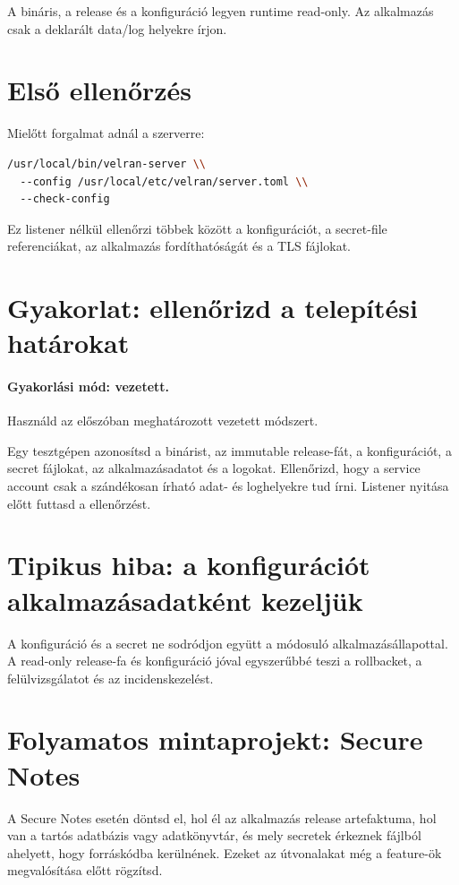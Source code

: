 A bináris, a release és a konfiguráció legyen runtime read-only. Az alkalmazás csak a deklarált data/log helyekre írjon.

\section{Első ellenőrzés}

Mielőtt forgalmat adnál a szerverre:

\begin{lstlisting}[language=bash]
/usr/local/bin/velran-server \\
  --config /usr/local/etc/velran/server.toml \\
  --check-config
\end{lstlisting}

Ez listener nélkül ellenőrzi többek között a konfigurációt, a secret-file referenciákat, az alkalmazás fordíthatóságát és a TLS fájlokat.

\section{Gyakorlat: ellenőrizd a telepítési határokat}
\paragraph{Gyakorlási mód: vezetett.} Használd az előszóban meghatározott vezetett módszert.

Egy tesztgépen azonosítsd a binárist, az immutable release-fát, a konfigurációt, a secret fájlokat, az alkalmazásadatot és a logokat. Ellenőrizd, hogy a service account csak a szándékosan írható adat- és loghelyekre tud írni. Listener nyitása előtt futtasd a  ellenőrzést.

\section{Tipikus hiba: a konfigurációt alkalmazásadatként kezeljük}
A konfiguráció és a secret ne sodródjon együtt a módosuló alkalmazásállapottal. A read-only release-fa és konfiguráció jóval egyszerűbbé teszi a rollbacket, a felülvizsgálatot és az incidenskezelést.

\section{Folyamatos mintaprojekt: Secure Notes}
A Secure Notes esetén döntsd el, hol él az alkalmazás release artefaktuma, hol van a tartós adatbázis vagy adatkönyvtár, és mely secretek érkeznek fájlból ahelyett, hogy forráskódba kerülnének. Ezeket az útvonalakat még a feature-ök megvalósítása előtt rögzítsd.
